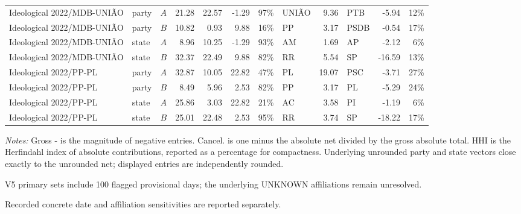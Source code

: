 \begin{landscape}
\begin{longtable}{L{4.3cm}llrrrrL{2.0cm}rL{2.0cm}rr}
Ideological 2022/MDB-UNIÃO & party & \(A\) & 21.28 & 22.57 & -1.29 & 97\% & UNIÃO & 9.36 & PTB & -5.94 & 12\% \\
Ideological 2022/MDB-UNIÃO & party & \(B\) & 10.82 & 0.93 & 9.88 & 16\% & PP & 3.17 & PSDB & -0.54 & 17\% \\
Ideological 2022/MDB-UNIÃO & state & \(A\) & 8.96 & 10.25 & -1.29 & 93\% & AM & 1.69 & AP & -2.12 & 6\% \\
Ideological 2022/MDB-UNIÃO & state & \(B\) & 32.37 & 22.49 & 9.88 & 82\% & RR & 5.54 & SP & -16.59 & 13\% \\
Ideological 2022/PP-PL & party & \(A\) & 32.87 & 10.05 & 22.82 & 47\% & PL & 19.07 & PSC & -3.71 & 27\% \\
Ideological 2022/PP-PL & party & \(B\) & 8.49 & 5.96 & 2.53 & 82\% & PP & 3.17 & PL & -5.29 & 24\% \\
Ideological 2022/PP-PL & state & \(A\) & 25.86 & 3.03 & 22.82 & 21\% & AC & 3.58 & PI & -1.19 & 6\% \\
Ideological 2022/PP-PL & state & \(B\) & 25.01 & 22.48 & 2.53 & 95\% & RR & 3.74 & SP & -18.22 & 17\% \\
\end{longtable}
\noindent\footnotesize\textit{Notes:} Gross - is the magnitude of negative entries. Cancel. is one minus the absolute net divided by the gross absolute total. HHI is the Herfindahl index of absolute contributions, reported as a percentage for compactness. Underlying unrounded party and state vectors close exactly to the unrounded net; displayed entries are independently rounded.
\endgroup
\end{landscape}

\par{\footnotesize V5 primary sets include 100 flagged provisional days; the underlying UNKNOWN affiliations remain unresolved.}\par{\footnotesize Recorded concrete date and affiliation sensitivities are reported separately.}
